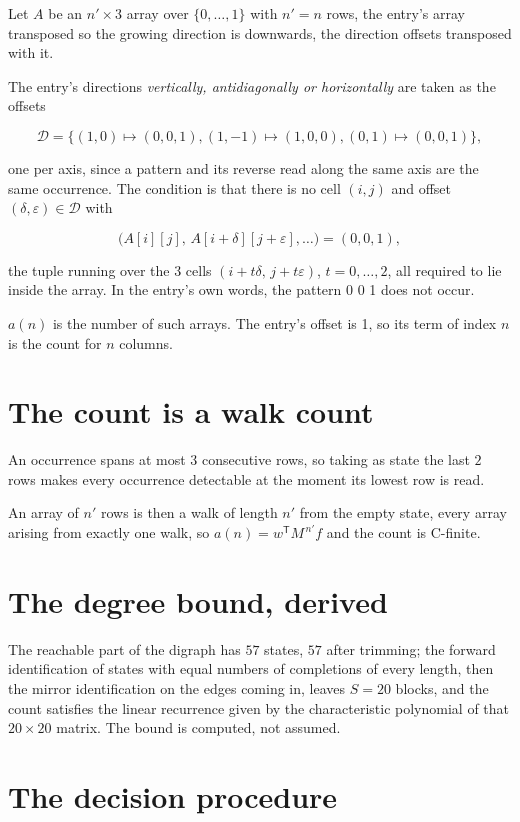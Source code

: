 \documentclass[11pt]{article}
\theoremstyle{definition}
\begin{document}
Let $A$ be an $n' \times 3$ array over $\{0,\dots,1\}$ with $n' = n$ rows, the entry's array transposed so the growing direction is downwards, the direction offsets transposed with it.

The entry's directions {\itshape vertically, antidiagonally or horizontally} are taken as the offsets

\[\mathcal{D} = \{(1,0)\mapsto(0,0,1), (1,-1)\mapsto(1,0,0), (0,1)\mapsto(0,0,1)\},\]

one per axis, since a pattern and its reverse read along the same axis are the same occurrence. The condition is that there is no cell $(i,j)$ and offset $(\delta,\varepsilon)\in\mathcal{D}$ with

\[\bigl(A[i][j],\,A[i{+}\delta][j{+}\varepsilon],\dots\bigr) = (0, 0, 1),\]

the tuple running over the $3$ cells $(i+t\delta,\,j+t\varepsilon)$, $t = 0,\dots,2$, all required to lie inside the array. In the entry's own words, the pattern 0 0 1 does not occur.

$a(n)$ is the number of such arrays. The entry's offset is 1, so its term of index $n$ is the count for $n$ columns.

\section{The count is a walk count}

An occurrence spans at most $3$ consecutive rows, so taking as state the last $2$ rows makes every occurrence detectable at the moment its lowest row is read.

An array of $n'$ rows is then a walk of length $n'$ from the empty state, every array arising from exactly one walk, so $a(n) = w^{\mathsf T}M^{\,n'}f$ and the count is C-finite.

\section{The degree bound, derived}

The reachable part of the digraph has $57$ states, $57$ after trimming; the forward identification of states with equal numbers of completions of every length, then the mirror identification on the edges coming in, leaves $S = 20$ blocks, and the count satisfies the linear recurrence given by the characteristic polynomial of that $20\times20$ matrix. The bound is computed, not assumed.

\section{The decision procedure}
\end{document}
